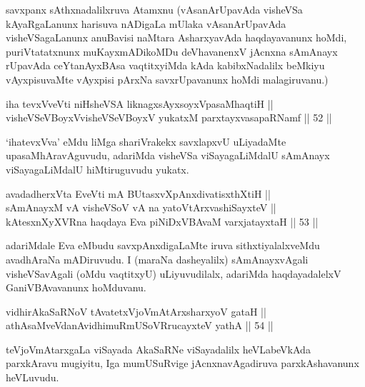 \begin{artha}
savxpanx sAthxnadalilxruva Atamxnu (vAsanArUpavAda visheVSa
kAyaRgaLanunx harisuva nADigaLa mUlaka vAsanArUpavAda visheVSagaLanunx
anuBavisi naMtara AsharxyavAda haqdayavanunx hoMdi, puriVtatatxnunx
muKayxmADikoMDu deVhavanenxV jAcnxna sAmAnayx rUpavAda ceYtanAyxBAsa
vaqtitxyiMda kAda kabibxNadalilx beMkiyu vAyxpisuvaMte vAyxpisi pArxNa
savxrUpavanunx hoMdi malagiruvanu.)
\end{artha}

\begin{shl}
iha tevxVveVti niHsheVSA liknagxsAyxsoyxVpasaMhaqtiH || \\
visheVSeVBoyxV\s visheVSeVBoyxV yukatxM parxtayxvasapaRNamf \hfill || 52 ||  
\end{shl}

\begin{artha}
`ihatevxVva' eMdu liMga shariVrakekx savxlapxvU uLiyadaMte
upasaMhAravAguvudu, adariMda visheVSa viSayagaLiMdalU sAmAnayx
viSayagaLiMdalU hiMtiruguvudu yukatx.
\end{artha}


\begin{shl}
avadadherxV\s ta EveVti mA BUtasxvXpAnxdivatisxthXtiH || \\
sAmAnayxM vA visheVSoV vA na yatoV\s tArxvashiSayxteV || \\
kAtesxnXyXVRna haqdaya Eva piNiDxVBAvaM varxjatayxtaH \hfill || 53 ||  
\end{shl}

\begin{artha}
adariMdale Eva eMbudu savxpAnxdigaLaMte iruva sithxtiyalalxveMdu
avadhAraNa mADiruvudu. I (maraNa dasheyalilx) sAmAnayxvAgali
visheVSavAgali (oMdu vaqtitxyU) uLiyuvudilalx, adariMda haqdayadalelxV
GaniVBAvavanunx hoMduvanu.
\end{artha}


\begin{shl}
vidhirAkaSaRNoV tAvatetxVjoVmAtArxsharxyoV gataH || \\
athAsaMveVdanAvidhimuRmUSoVRrucayxteV yathA \hfill || 54 ||  
\end{shl}

\begin{artha}
teVjoVmAtarxgaLa viSayada AkaSaRNe viSayadalilx heVLabeVkAda
parxkAravu mugiyitu, Iga mumUSuRvige jAcnxnavAgadiruva parxkAshavanunx heVLuvudu.
\end{artha}


